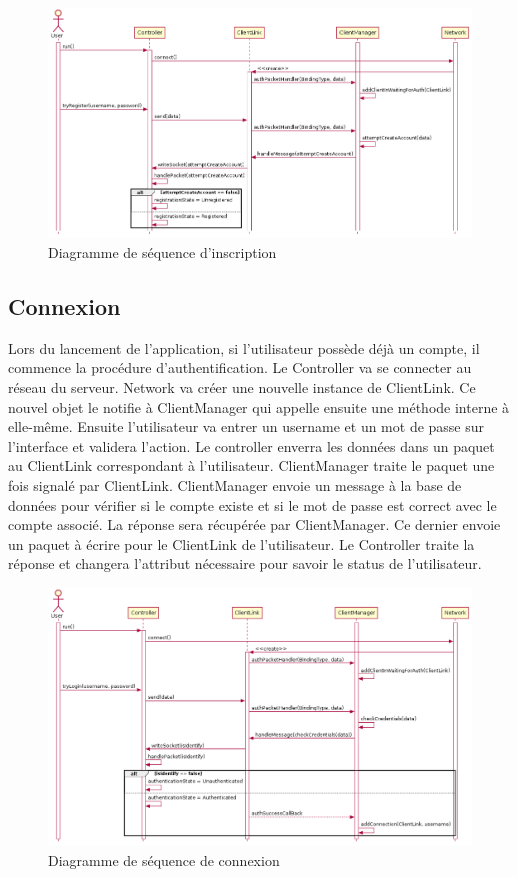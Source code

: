\documentclass{article}
\begin{document}
\begin{figure}[H]
    \centering
    \includegraphics[width=1\textwidth]{../res/uml/sequence/InscriptionSequence.png}
    \caption{Diagramme de séquence d'inscription}
    \label{fig:InscriptionDiagram}
\end{figure}

\subsection{Connexion}

Lors du lancement de l'application, si l'utilisateur possède déjà un compte, il commence la procédure d'authentification. Le Controller va se connecter au réseau du serveur. Network va créer une nouvelle instance de ClientLink. Ce nouvel objet le notifie à ClientManager qui appelle ensuite une méthode interne à elle-même. Ensuite l'utilisateur va entrer un username et un mot de passe sur l'interface et validera l'action. Le controller enverra les données dans un paquet au ClientLink correspondant à l'utilisateur. ClientManager traite le paquet une fois signalé par ClientLink. ClientManager envoie un message à la base de données pour vérifier si le compte existe et si le mot de passe est correct avec le compte associé. La réponse sera récupérée par ClientManager. Ce dernier envoie un paquet à écrire pour le ClientLink de l'utilisateur. Le Controller traite la réponse et changera l'attribut nécessaire pour savoir le status de l'utilisateur.

\begin{figure}[H]
    \centering
    \includegraphics[width=1\textwidth]{../res/uml/sequence/ConnexionSequence.png}
    \caption{Diagramme de séquence de connexion}
    \label{fig:ConnexionSeqDiagram}
\end{figure}
\end{document}
